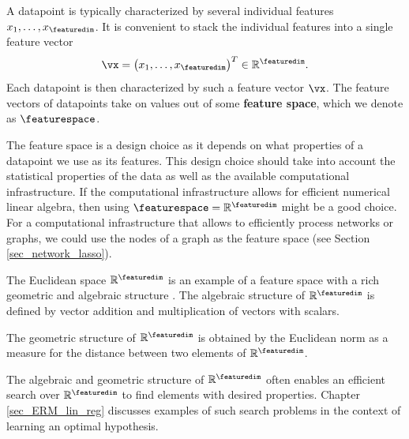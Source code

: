 \documentclass[12pt]{report}
\newcommand{\featurelen}{\featuredim}
\begin{document}
A datapoint is typically characterized by several individual features 
$x_{1},\ldots,x_{\featuredim}$. It is convenient to stack the individual 
features into a single feature vector 
\begin{equation}
\nonumber 
\vx=\big(x_{1},\ldots,x_{\featuredim}\big)^{T} \in \mathbb{R}^{\featuredim}. 
\end{equation}
Each datapoint is then characterized by such a feature vector $\vx$. 
The feature vectors of datapoints take on values out of some {\bf feature space}, 
which we denote as $\featurespace$. 

The feature space is a design choice as it depends on what properties of a 
datapoint we use as its features. This design choice should take into account 
the statistical properties of the data as well as the available computational infrastructure. 
If the computational infrastructure allows for efficient numerical linear algebra, 
then using $\featurespace = \mathbb{R}^{\featurelen}$ might be a good choice.
For a computational infrastructure that allows to efficiently process networks 
or graphs, we could use the nodes of a graph as the feature space (see Section \ref{sec_network_lasso}). 


 
The Euclidean space $\mathbb{R}^{\featuredim}$ is an example 
of a feature space with a rich geometric and algebraic structure \cite{RudinBookPrinciplesMatheAnalysis}. 
The algebraic structure of $\mathbb{R}^{\featuredim}$ is defined 
by vector addition and multiplication of vectors with scalars. 

The geometric structure of $\mathbb{R}^{\featuredim}$ is obtained 
by the Euclidean norm as a measure for the distance between two 
elements of $\mathbb{R}^{\featuredim}$. 

The algebraic and geometric structure of  $\mathbb{R}^{\featuredim}$ 
often enables an efficient search over $\mathbb{R}^{\featuredim}$ to 
find elements with desired properties. Chapter \ref{sec_ERM_lin_reg} 
discusses examples of such search problems in the context of learning 
an optimal hypothesis. 
\end{document}
